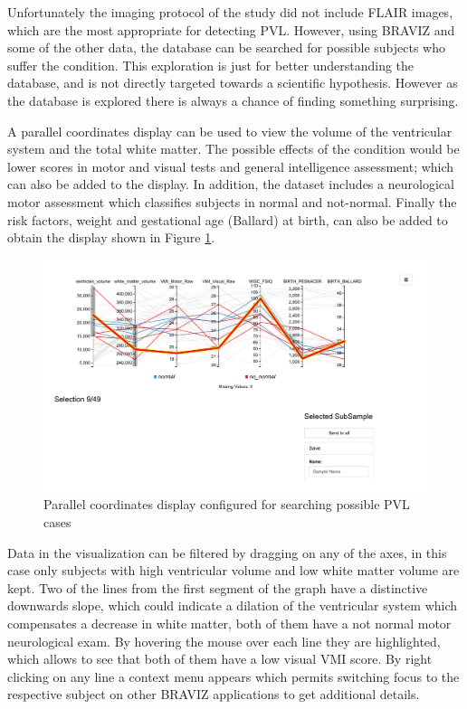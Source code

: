 \documentclass[twocolumn]{svjour3}
\begin{document}
Unfortunately the imaging protocol of the study did not include FLAIR images, which are the most appropriate for detecting PVL. However, using BRAVIZ and some of the other data, the database can be searched for possible subjects who suffer the condition. This exploration is just for better understanding the database, and is not directly targeted towards a scientific hypothesis. However as the database is explored there is always a chance of finding something surprising.

A parallel coordinates display can be used to view the volume of the ventricular system and the total white matter. The possible effects of the condition would be lower scores in motor and visual tests and general intelligence assessment; which can also be added to the display. In addition, the dataset includes a neurological motor assessment which classifies subjects in normal and not-normal.  Finally the risk factors, weight and gestational age (Ballard) at birth, can also be added to obtain the display shown in Figure \ref{fig_parallel}.

\begin{figure}
\begin{center}
\includegraphics[width=\linewidth,trim = 30mm 90mm 60mm 10mm ,clip]{parallel_coordinates_raw}
\end{center}
 \caption{\label{fig_parallel}Parallel coordinates display configured for searching possible PVL cases}
\end{figure}

Data in the visualization can be filtered by dragging on any of the axes, in this case only subjects with high ventricular volume and low white matter volume are kept. Two of the lines from the first segment of the graph have a distinctive downwards slope, which could indicate a dilation of the ventricular system which compensates a decrease in white matter, both of them have a not normal motor neurological exam. By hovering the mouse over each line they are highlighted, which allows to see that both of them have a low visual VMI score. By right clicking on any line a context menu appears which permits switching focus to the respective subject on other BRAVIZ applications to get additional details. 
\end{document}
